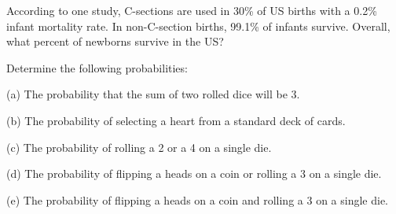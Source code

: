 \documentclass[12pt]{amsart}
\begin{document}
\begin{list}
\vspace{2in}

\item According to one study, C-sections are used in 30\% of US births with a 0.2\% infant mortality rate.  In non-C-section births, 99.1\% of infants survive.  Overall, what percent of newborns survive in the US?

\newpage

\item Determine the following probabilities:

\subitem(a) The probability that the sum of two rolled dice will be 3.

\vspace{1in}

\subitem(b) The probability of selecting a heart from a standard deck of cards.

\vspace{1in}

\subitem(c) The probability of rolling a 2 or a 4 on a single die.

\vspace{1in}

\subitem(d) The probability of flipping a heads on a coin or rolling a 3 on a single die.

\vspace{1in}

\subitem(e) The probability of flipping a heads on a coin and rolling a 3 on a single die.

\vspace{1in}



















\end{list}
\end{document}
